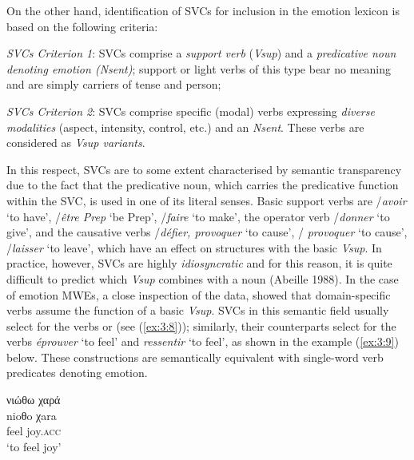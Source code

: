 \documentclass[output=paper]{langsci/langscibook}
\begin{document}
On the other hand, identification of SVCs for inclusion in the emotion
lexicon is based on the following criteria:

\textit{SVCs Criterion 1}: SVCs comprise a \textit{support verb} (\textit{Vsup}) and a \textit{predicative
noun denoting emotion (Nsent)}; support or light verbs of this type
bear no meaning and are simply carriers of tense and person;

\textit{SVCs Criterion 2}: SVCs comprise specific (modal) verbs expressing
\textit{diverse modalities} (aspect, intensity, control,
etc.) and an \textit{Nsent}. These verbs are considered as \textit{Vsup
variants}.


In this respect, SVCs are \textendash{} to some extent \textendash{} characterised by
semantic transparency due to the fact that the predicative noun, which
carries the predicative function within the SVC, is used in one of its
literal senses. Basic support verbs are 
/\textit{avoir }‘to have’,
/\textit{être Prep }‘be Prep’, 
/\textit{faire }‘to make’,
the operator verb 
/\textit{donner }‘to give’,
and the causative verbs 
/\textit{défier, provoquer }‘to cause’, 
/ \textit{pro\-vo\-quer }‘to cause’, 
/\textit{laisser }‘to leave’, which
have an effect on structures with the basic \textit{Vsup}. In practice,
however, SVCs are highly \textit{idiosyncratic} and for this
reason, it is quite difficult to predict which \textit{Vsup} combines
with a noun (Abeille 1988). In the case of emotion MWEs, a close
inspection of the data, showed that domain-specific verbs assume the
function of a basic \textit{Vsup}.  SVCs in this
semantic field usually select for the verbs 
 or
 (see (\ref{ex:3:8})); similarly,
their  counterparts select for the verbs \textit{éprouver} ‘to feel’
and \textit{ressentir }‘to feel’, as shown in the example (\ref{ex:3:9}) below.
These constructions are semantically equivalent with single-word verb
predicates denoting emotion.

\begin{exe}
\ex \label{ex:3:8}
\glll νιώθω χαρά \\
nioθo χara\\
feel joy.\textsc{acc}\\
\glt %
‘to feel joy’
\end{exe}
\end{document}
